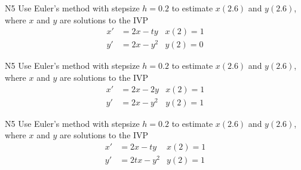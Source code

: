\begin{problem}{N5}
Use Euler's method with stepsize \(h=0.2\) to estimate \(x(2.6)\) and \(y(2.6)\), where \(x\) and \(y\) are solutions to the IVP
\begin{align*}
x'&=2x-ty & x(2)=1 \\
y'&=2x-y^2 & y(2)=0 
\end{align*}
\end{problem}

\begin{problem}{N5}
Use Euler's method with stepsize \(h=0.2\) to estimate \(x(2.6)\) and \(y(2.6)\), where \(x\) and \(y\) are solutions to the IVP
\begin{align*}
x'&=2x-2y & x(2)=1 \\
y'&=2x-y^2 & y(2)=1 
\end{align*}
\end{problem}

\begin{problem}{N5}
Use Euler's method with stepsize \(h=0.2\) to estimate \(x(2.6)\) and \(y(2.6)\), where \(x\) and \(y\) are solutions to the IVP
\begin{align*}
x'&=2x-ty & x(2)=1 \\
y'&=2tx-y^2 & y(2)=1 
\end{align*}
\end{problem}
